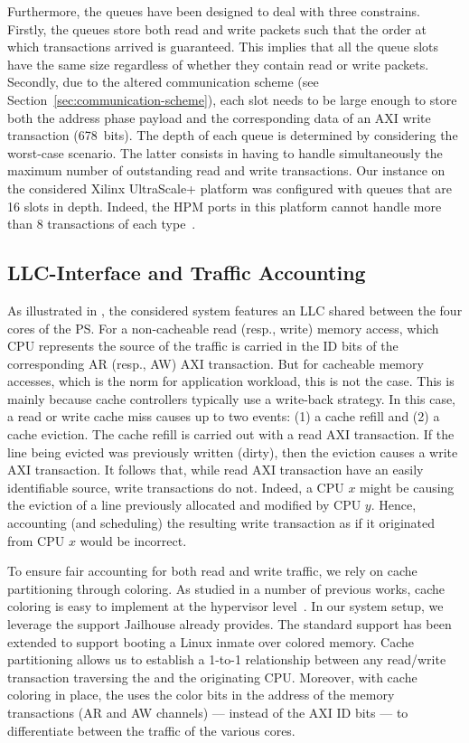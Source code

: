 Furthermore, the queues have been designed to deal with three
constrains.  Firstly, the queues store both read and write packets
such that the order at which transactions arrived is guaranteed. This
implies that all the queue slots have the same size regardless of
whether they contain read or write packets.  Secondly, due to the
altered communication scheme (see
Section~\ref{sec:communication-scheme}), each slot needs to be large
enough to store both the address phase payload and the corresponding
data of an AXI write transaction (678~bits). The depth of each queue
is determined by considering the worst-case scenario. The latter
consists in having to handle simultaneously the maximum number of
outstanding read and write transactions. Our \schim instance on the
considered Xilinx UltraScale+ platform was configured with queues that
are 16 slots in depth. Indeed, the HPM ports in this platform cannot
handle more than 8 transactions of each
type~\cite{Xilinx-ULTRASCALE-TRM}.

\subsection{LLC-\schim Interface and Traffic Accounting}
As illustrated in , the considered system
features an LLC shared between the four cores of the PS. For a
non-cacheable read (resp., write) memory access, which CPU represents
the source of the traffic is carried in the ID bits of the
corresponding AR (resp., AW) AXI transaction. But for cacheable memory
accesses, which is the norm for application workload, this is not the
case. This is mainly because cache controllers typically use a
write-back strategy. In this case, a read or write cache miss causes
up to two events: (1) a cache refill and (2) a cache eviction. The
cache refill is carried out with a read AXI transaction. If the line
being evicted was previously written (dirty), then the eviction causes
a write AXI transaction. It follows that, while read AXI transaction
have an easily identifiable source, write transactions do not. Indeed,
a CPU $x$ might be causing the eviction of a line previously allocated
and modified by CPU $y$. Hence, accounting (and scheduling) the
resulting write transaction as if it originated from CPU $x$ would be
incorrect.

To ensure fair accounting for both read and write traffic, we rely on
cache partitioning through coloring. As studied in a number of
previous works, cache coloring is easy to implement at the hypervisor
level~\cite{xvisor2018, cachepart, determ_virt}. In our system setup,
we leverage the support Jailhouse already provides. The standard
support has been extended to support booting a Linux inmate over
colored memory. Cache partitioning allows us to establish a 1-to-1
relationship between any read/write transaction traversing the \schim
and the originating CPU. Moreover, with cache coloring in place, the
\schim uses the color bits in the address of the memory transactions
(AR and AW channels) --- instead of the AXI ID bits --- to
differentiate between the traffic of the various cores.

